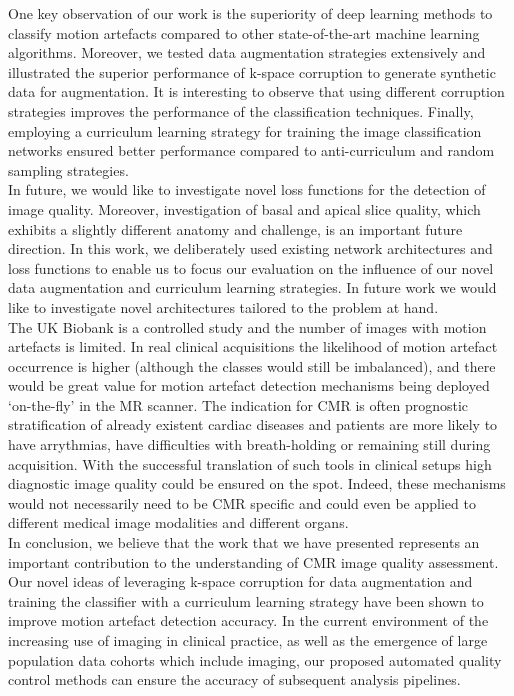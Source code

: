 \documentclass[preprint,12pt,authoryear]{elsarticle}
\begin{document}
One key observation of our work is the superiority of deep learning methods to classify motion artefacts compared to other state-of-the-art machine learning algorithms. Moreover, we tested data augmentation strategies extensively and illustrated the superior performance of k-space corruption to generate synthetic data for augmentation. It is interesting to observe that using different corruption strategies improves the performance of the classification techniques. Finally, employing a curriculum learning strategy for training the image classification networks ensured better performance compared to anti-curriculum and random sampling strategies.\\


In future, we would like to investigate novel loss functions for the detection of image quality. Moreover, investigation of basal and apical slice quality, which exhibits a slightly different anatomy and challenge, is an important future direction. In this work, we deliberately used existing network architectures and loss functions to enable us to focus our evaluation on the influence of our novel data augmentation and curriculum learning strategies. In future work we would like to investigate novel architectures tailored to the problem at hand. \\


The UK Biobank is a controlled study and the number of images with motion artefacts is limited. In real clinical acquisitions the likelihood of motion artefact occurrence is higher (although the classes would still be imbalanced), and there would be great value for motion artefact detection mechanisms being deployed `on-the-fly' in the MR scanner. The indication for CMR is often prognostic stratification of already existent cardiac diseases and  patients are more likely to have arrythmias, have difficulties with breath-holding  or remaining still during acquisition. With the successful translation of such tools in clinical setups high diagnostic image quality could be ensured on the spot. Indeed, these mechanisms would not necessarily need to be CMR specific and could even be applied to different medical image modalities and different organs.\\

In conclusion, we believe that the work that we have presented represents an important contribution to the understanding of CMR image quality assessment. Our novel ideas of leveraging k-space corruption for data augmentation and training the classifier with a curriculum learning strategy have been shown to improve motion artefact detection accuracy.  In the current environment of the increasing use of imaging in clinical practice, as well as the emergence of large population data cohorts which include imaging, our proposed automated quality control methods can ensure the accuracy of subsequent analysis pipelines.
\end{document}
